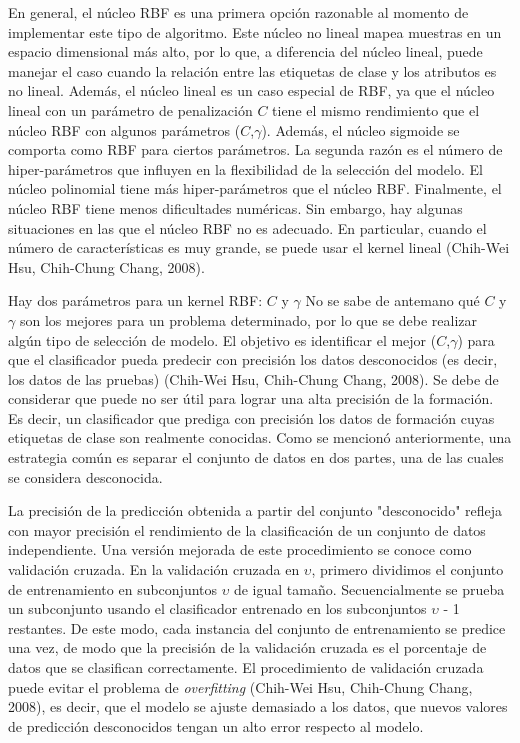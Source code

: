 En general, el núcleo RBF es una primera opción razonable al momento de implementar este tipo de algoritmo. Este núcleo no lineal mapea muestras en un espacio dimensional más alto, por lo que, a diferencia del núcleo lineal, puede manejar el caso cuando la relación entre las etiquetas de clase y los atributos es no lineal.  Además, el núcleo lineal es un caso especial de RBF, ya que el núcleo lineal con un parámetro de penalización $C$ tiene el mismo rendimiento que el núcleo RBF con algunos parámetros ($C$,$\gamma$).  Además, el núcleo sigmoide se comporta como RBF para ciertos parámetros. La segunda razón es el número de hiper-parámetros que influyen en la flexibilidad de la selección del modelo.  El núcleo polinomial tiene más hiper-parámetros que el núcleo RBF. Finalmente, el núcleo RBF tiene menos dificultades numéricas. Sin embargo, hay algunas situaciones en las que el núcleo RBF no es adecuado. En particular, cuando el número de características es muy grande, se puede usar el kernel lineal (Chih-Wei Hsu, Chih-Chung Chang, 2008).

Hay dos parámetros para un kernel RBF: $C$ y $\gamma$  No se sabe de antemano qué $C$ y $\gamma$ son los mejores para un problema determinado, por lo que se debe realizar algún tipo de selección de modelo.  El objetivo es identificar el mejor ($C$,$\gamma$) para que el clasificador pueda predecir con precisión los datos desconocidos (es decir, los datos de las pruebas) (Chih-Wei Hsu, Chih-Chung Chang, 2008).  Se debe de considerar que puede no ser útil para lograr una alta precisión de la formación. Es decir, un clasificador que prediga con precisión los datos de formación cuyas etiquetas de clase son realmente conocidas.  Como se mencionó anteriormente, una estrategia común es separar el conjunto de datos en dos partes, una de las cuales se considera desconocida.  

La precisión de la predicción obtenida a partir del conjunto "desconocido" refleja con mayor precisión el rendimiento de la clasificación de un conjunto de datos independiente.  Una versión mejorada de este procedimiento se conoce como validación cruzada. En la validación cruzada en $\upsilon$, primero dividimos el conjunto de entrenamiento en subconjuntos $\upsilon$ de igual tamaño.  Secuencialmente se prueba un subconjunto usando el clasificador entrenado en los subconjuntos $\upsilon$ - 1 restantes.  De este modo, cada instancia del conjunto de entrenamiento se predice una vez, de modo que la precisión de la validación cruzada es el porcentaje de datos que se clasifican correctamente. El procedimiento de validación cruzada puede evitar el problema de \textit{overfitting} (Chih-Wei Hsu, Chih-Chung Chang, 2008), es decir, que el modelo se ajuste demasiado a los datos, que nuevos valores de predicción desconocidos tengan un alto error respecto al modelo. 

